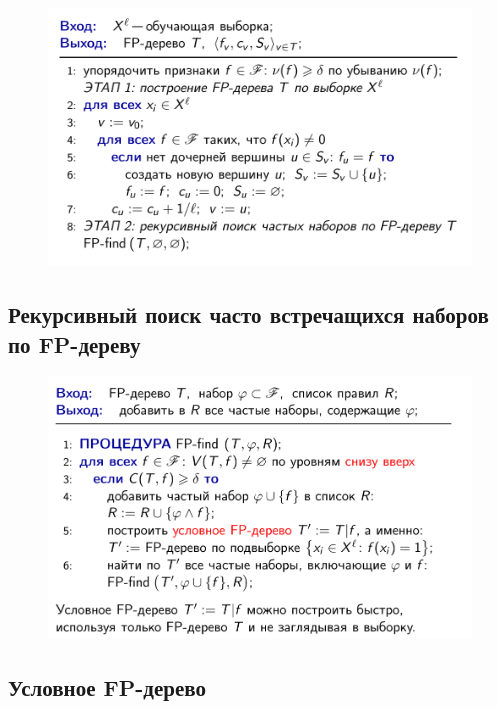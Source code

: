 \documentclass{beamer}
\begin{document}
\begin{frame}
	\begin{figure}[h]
		\centering
		\includegraphics[scale=0.45]{images/lec08-pic43.png}
	\end{figure}
\end{frame}

\subsection{Рекурсивный поиск часто встречащихся наборов по FP-дереву}

\begin{frame}
	\begin{figure}[h]
		\centering
		\includegraphics[scale=0.45]{images/lec08-pic44.png}
	\end{figure}
\end{frame}

\subsection{Условное FP-дерево}
\end{document}
